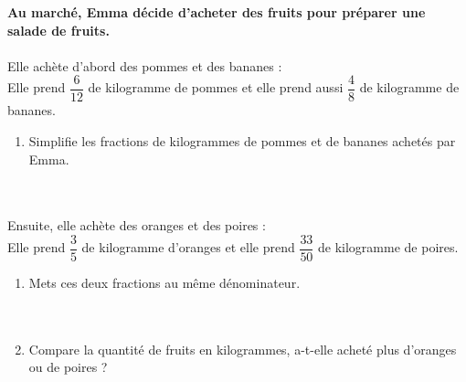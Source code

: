\documentclass[10pt]{article}
\begin{document}
\begin{exercicedevoir}[5][Problème]
\textbf{Au marché, Emma décide d'acheter des fruits pour préparer une
salade de fruits.} \\ \\
Elle achète d'abord des pommes et des bananes : \\
Elle prend $\dfrac{6}{12}$ de kilogramme de pommes et elle prend aussi $\dfrac{4}{8}$ de kilogramme de bananes.
\begin{enumerate}
\item Simplifie les fractions de kilogrammes de pommes et de bananes
achetés par Emma.  \\ \dtf \\ \dtf \\ \dtf
\end{enumerate} 
Ensuite, elle achète des oranges et des poires : \\
Elle prend $\dfrac{3}{5}$ de kilogramme d’oranges et elle prend
$\dfrac{33}{50}$ de kilogramme de poires.
\begin{enumerate}[resume]
\item  Mets ces deux fractions au même dénominateur. \\ \dtf \\ \dtf \\ \dtf
\item Compare la quantité  de fruits en kilogrammes, a-t-elle acheté plus d'oranges ou de poires ? \\ \dtf \\ \dtf \\ \dtf
\end{enumerate} 
\end{exercicedevoir}

\nonewpage
\end{document}
